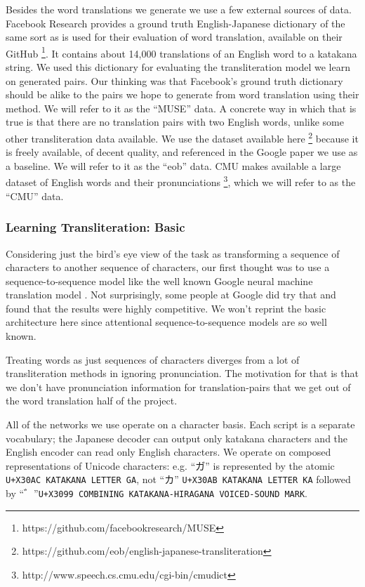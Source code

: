 \documentclass{article}
\begin{document}
Besides the word translations we generate
we use a few external sources of data.
Facebook Research provides a ground truth English-Japanese dictionary
of the same sort as is used for their evaluation of word translation,
available on their GitHub
\footnote{https://github.com/facebookresearch/MUSE}.
It contains about 14,000 translations of an English word to a katakana string.
We used this dictionary for evaluating the transliteration model
we learn on generated pairs.
Our thinking was that Facebook's ground truth dictionary
should be alike to the pairs we hope to generate from word translation
using their method.
We will refer to it as the ``MUSE'' data.
A concrete way in which that is true is that
there are no translation pairs with two English words,
unlike some other transliteration data available.
We use the dataset available here
\footnote{https://github.com/eob/english-japanese-transliteration}
because it is freely available,
of decent quality,
and referenced in the Google paper\cite{Rosca2016SequencetosequenceNN}
we use as a baseline.
We will refer to it as the ``eob'' data.
CMU makes available a large dataset of English words and their pronunciations
\footnote{http://www.speech.cs.cmu.edu/cgi-bin/cmudict},
which we will refer to as the ``CMU'' data.

\subsubsection*{Learning Transliteration: Basic}

Considering just the bird's eye view of the task
as transforming a sequence of characters to another sequence of characters,
our first thought was to use a sequence-to-sequence model
like the well known Google neural machine translation model
\cite{Wu2016GooglesNM}.
Not surprisingly,
some people at Google did try that \cite{Rosca2016SequencetosequenceNN}
and found that the results were highly competitive.
We won't reprint the basic architecture here
since attentional sequence-to-sequence models \cite{Bahdanau2015NeuralMT}
are so well known.

Treating words as just sequences of characters
diverges from a lot of transliteration methods
in ignoring pronunciation.
The motivation for that
is that we don't have pronunciation information for translation-pairs
that we get out of the word translation half of the project.

All of the networks we use operate on a character basis.
Each script is a separate vocabulary;
the Japanese decoder can output only katakana characters
and the English encoder can read only English characters.
We operate on composed representations of Unicode characters:
e.g. ``ガ'' is represented by the atomic \texttt{U+X30AC KATAKANA LETTER GA},
not ``カ'' \texttt{U+X30AB KATAKANA LETTER KA} followed by
``゛''\texttt{U+X3099 COMBINING KATAKANA-HIRAGANA VOICED-SOUND MARK}.
\end{document}
